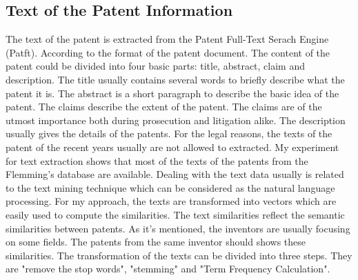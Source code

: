 \subsection{Text of the Patent Information}
The text of the patent is extracted from the Patent Full-Text Serach Engine (Patft).  According to the format of the patent document. The content of the patent could be divided into four basic parts: title, abstract, claim and description. The title usually contains several words to briefly describe what the patent it is. The abstract is a short paragraph to describe the basic idea of the patent. The claims describe the extent of the patent. The claims are of the utmost importance both during prosecution and litigation alike. The description usually gives the details of the patents. For the legal reasons, the texts of the patent of the recent years usually are not allowed to extracted. My experiment for text extraction shows that most of the texts of the patents from the Flemming's database are available. Dealing with the text data usually is related to the text mining technique which can be considered as the natural language processing. For my approach, the texts are transformed into vectors which are easily used to compute the similarities. The text similarities  reflect the semantic similarities between patents. As it's mentioned, the inventors are usually focusing on some fields. The patents from the same inventor should shows these similarities. The transformation of the texts can be divided into three steps. They are "remove the stop words", "stemming" and "Term Frequency Calculation". 

